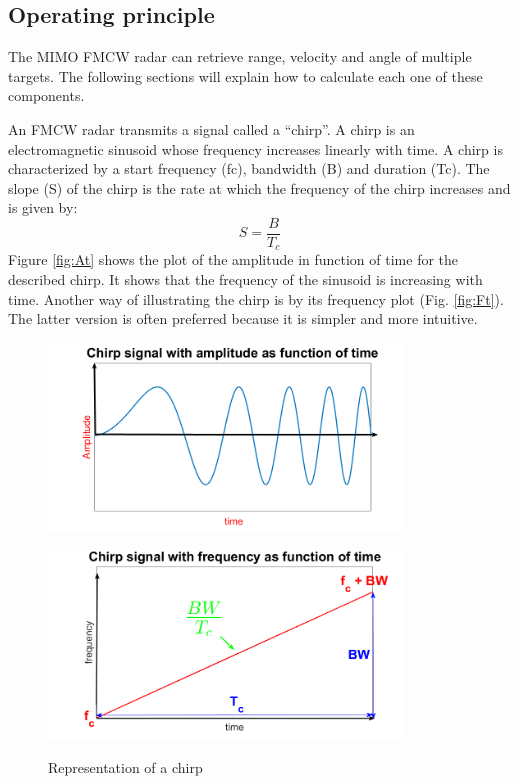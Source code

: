 \subsection{Operating principle}
The \ac{MIMO} \ac{FMCW}  radar can retrieve range, velocity and angle of multiple targets. The following sections will explain how to calculate each one of these components.


An \ac{FMCW} radar transmits a signal called a “chirp”. A chirp is an electromagnetic sinusoid whose frequency  increases linearly with time. A chirp is characterized by a start frequency (fc), bandwidth (B) and duration (Tc). The slope (S) of the chirp is the rate at which the frequency of the chirp increases and is given by:
\begin{equation}
    S=\frac{B}{T_c}
\end{equation}
Figure \ref{fig:At} shows the plot of the amplitude in function of time for the described chirp. It shows that the frequency of the sinusoid is increasing with time. Another way of illustrating the chirp is by its frequency plot (Fig. \ref{fig:Ft}). The latter version is often preferred because it is simpler and more intuitive.

\begin{figure}[ht] 
    \begin{minipage}[b]{.49\linewidth}
        \includegraphics[height=5cm,width=\linewidth]{imgs/chapter2/chirpAt.png}
        \label{fig:At}
    \end{minipage}
    \begin{minipage}[b]{.49\linewidth}
        \includegraphics[height=5cm,width=\linewidth]{imgs/chapter2/chirpFt.png}
        \label{fig:Ft}
    \end{minipage}
    \caption{Representation of a chirp}
    \label{fig:chirp}
\end{figure}


